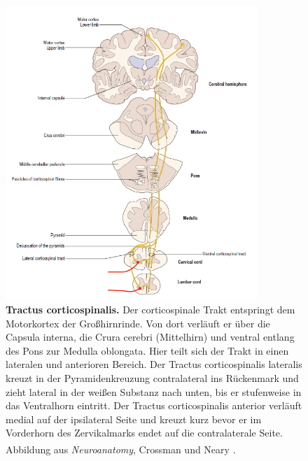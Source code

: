 \documentclass[12pt,a4paper,pdftex]{article}
\begin{document}
\begin{figure}[H]
    \centering
    \includegraphics[width=0.85\textwidth]{pictures/Bilder_Laura/corticospinal_tract.PNG}
    \caption[Tractus corticospinalis]{\textbf{Tractus corticospinalis.} Der corticospinale Trakt entspringt dem Motorkortex der Großhirnrinde. Von dort verläuft er über die Capsula interna, die Crura cerebri (Mittelhirn) und ventral entlang des Pons zur Medulla oblongata. Hier teilt sich der Trakt in einen lateralen und anterioren Bereich. Der Tractus corticospinalis lateralis kreuzt in der Pyramidenkreuzung contralateral ins Rückenmark und zieht lateral in der weißen Substanz nach unten, bis er stufenweise in das Ventralhorn eintritt. Der Tractus corticospinalis anterior verläuft medial auf der ipsilateral Seite und kreuzt kurz bevor er im Vorderhorn des Zervikalmarks endet auf die contralaterale Seite. \\
    Abbildung aus \textit{Neuroanatomy}, Crossman und Neary \textsuperscript{\cite[8]{crossman2014neuroanatomy}}.}
    \label{fig:tr_corticospinalis}
\end{figure}
\end{document}
